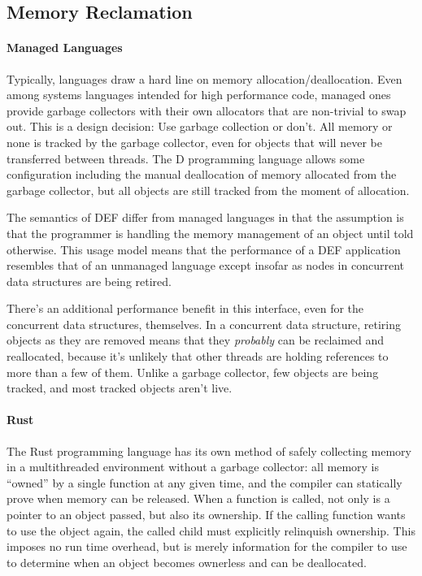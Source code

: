 \subsection{Memory Reclamation}

\paragraph{Managed Languages} Typically, languages draw a hard line on memory allocation/deallocation.  Even among systems languages intended for high performance code, managed ones provide garbage collectors with their own allocators that are non-trivial to swap out.\cite{Go}\cite{DotNetGC}\cite{D}  This is a design decision: Use garbage collection or don't.  All memory or none is tracked by the garbage collector, even for objects that will never be transferred between threads.  The D programming language allows some configuration including the manual deallocation of memory allocated from the garbage collector, but all objects are still tracked from the moment of allocation.\cite{DPhobos}

The semantics of DEF differ from managed languages in that the assumption is that the programmer is handling the memory management of an object until told otherwise.  This usage model means that the performance of a DEF application resembles that of an unmanaged language except insofar as nodes in concurrent data structures are being retired.

There's an additional performance benefit in this interface, even for the concurrent data structures, themselves.  In a concurrent data structure, retiring objects as they are removed means that they \textit{probably} can be reclaimed and reallocated, because it's unlikely that other threads are holding references to more than a few of them.  Unlike a garbage collector, few objects are being tracked, and most tracked objects aren't live.

\paragraph{Rust} The Rust programming language has its own method of safely collecting memory in a multithreaded environment without a garbage collector: all memory is ``owned'' by a single function at any given time, and the compiler can statically prove when memory can be released.\cite{Rust}  When a function is called, not only is a pointer to an object passed, but also its ownership.  If the calling function wants to use the object again, the called child must explicitly relinquish ownership.  This imposes no run time overhead, but is merely information for the compiler to use to determine when an object becomes ownerless and can be deallocated.

